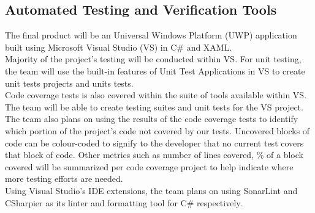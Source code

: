 \documentclass[12pt, titlepage]{article}
\begin{document}


\subsection{Automated Testing and Verification Tools}

The final product will be an Universal Windows Platform (UWP) application built using Microsoft Visual Studio (VS) in C\# and XAML. \\

\noindent Majority of the project's testing will be conducted within VS. 
For unit testing, the team will use the built-in features of Unit Test Applications in VS to create unit tests projects and units tests.\\

\noindent Code coverage tests is also covered within the suite of tools available within VS. The team will be able to create testing suites and 
unit tests for the VS project. The team also plans on using the results of the code coverage
tests to identify which portion of the project's code not covered by our tests. Uncovered blocks of code can be colour-coded to signify to 
the developer that no current test covers that block of code. Other metrics such as number of lines covered, \% of a block covered will be 
summarized per code coverage project to help indicate where more testing efforts are needed. \\

\noindent Using Visual Studio's IDE extensions, the team plans on using SonarLint and CSharpier as its linter and formatting tool for C\# respectively. 

\end{document}
